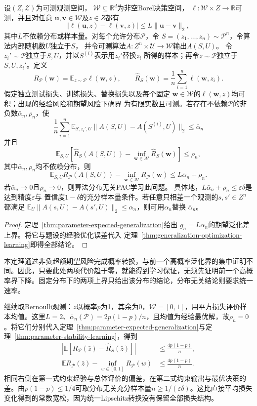 \begin{theorem}[参数稳定性与可学习性]
\label{thm:parameter-stability-learning}
设$(Z,\mathcal Z)$为可测观测空间，
$\mathcal W\subseteq\mathbb R^d$为非空Borel决策空间，
$\ell:\mathcal W\times Z\to\mathbb R$可测，并且对任意
$\bm u,\bm v\in\mathcal W$及$z\in Z$都有
\[
 |\ell(\bm u,z)-\ell(\bm v,z)|
 \leq L\|\bm u-\bm v\|_2,
\]
其中$L$不依赖分布或样本量。对每个允许分布$\mathcal P$，令
$S=(z_1,\ldots,z_n)\sim\mathcal P^n$，令算法内部随机数$U$独立于$S$，
并令可测算法$A:Z^n\times\mathcal U\to\mathcal W$输出$A(S,U)$。
令$z_i'\sim\mathcal P$独立于$S,U$，并以$S^{(i)}$表示用$z_i'$替换$z_i$
所得的样本；再令$z\sim\mathcal P$独立于$S,U,z_i'$。定义
\[
 R_{\mathcal P}(\bm w)=\mathbb E_{z\sim\mathcal P}\ell(\bm w,z),
 \qquad
 \hat R_S(\bm w)=\frac1n\sum_{i=1}^n\ell(\bm w,z_i).
\]
假定独立测试损失、训练损失、替换损失以及每个固定
$\bm w\in\mathcal W$的$\ell(\bm w,z)$均可积；出现的经验风险和期望风险下确界
为有限实数且可测。若存在不依赖$\mathcal P$的非负数$\bar\alpha_n,\rho_n$，使
\[
 \frac1n\sum_{i=1}^n\mathbb E_{S,z_i',U}
 \|A(S,U)-A(S^{(i)},U)\|_2\leq\bar\alpha_n
\]
并且
\[
 \mathbb E_{S,U}\!\left[\hat R_S(A(S,U))-
 \inf_{\bm w\in\mathcal W}\hat R_S(\bm w)\right]\leq\rho_n,
\]
其中$\bar\alpha_n,\rho_n$均不依赖分布，则
\[
 \mathbb E_{S,U}R_{\mathcal P}(A(S,U))-
 \inf_{\bm w\in\mathcal W}R_{\mathcal P}(\bm w)
 \leq L\bar\alpha_n+\rho_n.
\]
若$\bar\alpha_n\to0$且$\rho_n\to0$，则算法分布无关PAC学习此问题。
具体地，$L\bar\alpha_n+\rho_n\leq\varepsilon\delta$是达到精度$\varepsilon$与
置信度$1-\delta$的充分样本量条件。若任意只相差一个观测的$s,s'\in Z^n$都满足
$\mathbb E_U\|A(s,U)-A(s',U)\|_2\leq\alpha_n$，则可用$\alpha_n$替换
$\bar\alpha_n$。
\end{theorem}
\begin{proof}
定理~\ref{thm:parameter-expected-generalization}给出
$g_n=L\bar\alpha_n$的期望泛化差上界。将它与题设的经验优化误差代入
定理~\ref{thm:generalization-optimization-learning}即得全部结论。
\end{proof}

本定理通过非负超额期望风险完成概率转换，与前一个高概率泛化界的集中证明不同。因此，只要此处两项代价趋于零，就能得到学习保证，无须先证明前一个高概率界下降。固定分布下的两项上界只给出该分布的结论，分布无关结论则要求统一速率。

继续取Bernoulli观测：$z$以概率$p$为1，其余为0，$\mathcal W=[0,1]$，用平方损失评价样本均值。这里$L=2$、$\bar\alpha_n(\mathcal P)=2p(1-p)/n$，且均值为经验最优解，故$\rho_n=0$。将它们分别代入定理~\ref{thm:parameter-expected-generalization}与定理~\ref{thm:parameter-stability-learning}，得到
\begin{align*}
 \left|\mathbb E[R_{\mathcal P}(\bar z)-\hat R_S(\bar z)]\right|
 &\leq\frac{4p(1-p)}n,\\
 \mathbb E R_{\mathcal P}(\bar z)-\inf_{w\in[0,1]}R_{\mathcal P}(w)
 &\leq\frac{4p(1-p)}n.
\end{align*}
相同右侧在第一式约束经验与总体评价的偏差，在第二式约束输出与最优决策的差。由$p(1-p)\leq1/4$可取分布无关充分样本量$n\geq1/(\varepsilon\delta)$。这比直接平均损失变化得到的常数宽松，因为统一Lipschitz转换没有保留全部损失结构。

